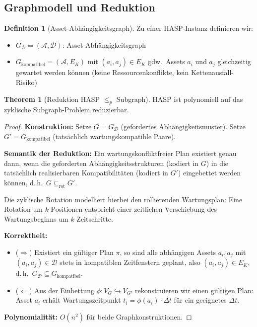 ﻿\documentclass[a4paper,12pt]{article}
\theoremstyle{definition}
\newtheorem{definition}{Definition}[section]
\newtheorem{theorem}{Theorem}[section]
\begin{document}
\subsection{Graphmodell und Reduktion}

\begin{definition}[Asset-Abhängigkeitsgraph]
\label{def:aag}
Zu einer HASP-Instanz definieren wir:
\begin{itemize}
    \item $G_{\mathcal{D}} = (\mathcal{A}, \mathcal{D})$: Asset-Abhängigkeitsgraph
    \item $G_{\mathrm{kompatibel}} = (\mathcal{A}, E_K)$ mit $(a_i, a_j) \in E_K$ gdw.\
          Assets $a_i$ und $a_j$ gleichzeitig gewartet werden können
          (keine Ressourcenkonflikte, kein Kettenausfall-Risiko)
\end{itemize}
\end{definition}

\begin{theorem}[Reduktion HASP $\leq_p$ Subgraph]
\label{thm:hasp-red}
HASP ist polynomiell auf das zyklische Subgraph-Problem reduzierbar.
\end{theorem}

\begin{proof}
\textbf{Konstruktion:}
Setze $G = G_{\mathcal{D}}$ (gefordertes Abhängigkeitsmuster).
Setze $G' = G_{\mathrm{kompatibel}}$ (tatsächlich wartungskompatible Paare).

\textbf{Semantik der Reduktion:}
Ein wartungskonfliktfreier Plan existiert genau dann, wenn die geforderten
Abhängigkeitsstrukturen (kodiert in $G$) in die tatsächlich realisierbaren
Kompatibilitäten (kodiert in $G'$) eingebettet werden können, d.\,h.\ $G \subseteq_{\mathrm{rot}} G'$.

Die zyklische Rotation modelliert hierbei den rollierenden Wartungsplan:
Eine Rotation um $k$ Positionen entspricht einer zeitlichen Verschiebung des
Wartungsbeginns um $k$ Zeitschritte.

\textbf{Korrektheit:}
\begin{itemize}
    \item ($\Rightarrow$) Existiert ein gültiger Plan $\pi$, so sind alle
          abhängigen Assets $a_i, a_j$ mit $(a_i, a_j) \in \mathcal{D}$ stets in
          kompatiblen Zeitfenstern geplant, also $(a_i, a_j) \in E_K$,
          d.\,h.\ $G_{\mathcal{D}} \subseteq G_{\mathrm{kompatibel}}$.
    \item ($\Leftarrow$) Aus der Einbettung $\phi: V_G \hookrightarrow V_{G'}$
          rekonstruieren wir einen gültigen Plan: Asset $a_i$ erhält Wartungszeitpunkt
          $t_i = \phi(a_i) \cdot \Delta t$ für ein geeignetes $\Delta t$.
\end{itemize}

\textbf{Polynomialität:} $O(n^2)$ für beide Graphkonstruktionen.
\end{proof}
\end{document}
